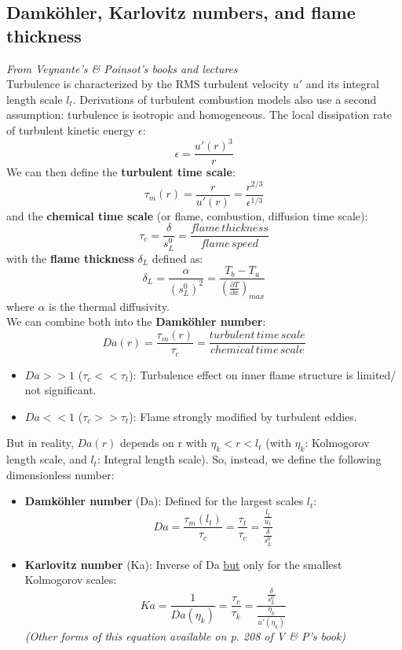 \documentclass[a4paper,11pt]{article}
\begin{document}
\subsection{Damköhler, Karlovitz numbers, and flame thickness}
\textit{From Veynante's \& Poinsot's books and lectures}\vspace{5pt}\\
	Turbulence is characterized by the RMS turbulent velocity $u'$ and its integral length scale $l_t$. Derivations of turbulent combustion models also use a second assumption: turbulence is isotropic and homogeneous. The local dissipation rate of turbulent kinetic energy $\epsilon$:
	\[\epsilon = \frac{u'(r)^3}{r}\]
	We can then define the \textbf{turbulent time scale}: 
	\[\tau_m(r) = \frac{r}{u'(r)} = \frac{r^{2/3}}{\epsilon^{1/3}}\] 
	and the \textbf{chemical time scale} (or flame, combustion, diffusion time scale):
	\[\tau_c = \frac{\delta}{s^0_L} = \frac{flame\,thickness}{flame\,speed} \]
	with the \textbf{flame thickness} $\delta_L$ defined as: 
	\[ \delta_L = \frac{\alpha}{(s^0_L)^2} = \frac{T_b-T_u}{(\frac{\partial T}{\partial x})_{max}}\]
	where $\alpha$ is the thermal diffusivity.\\
	We can combine both into the \textbf{Damköhler number}:
	\[Da(r) = \frac{\tau_m(r)}{\tau_c}= \frac{turbulent\,time\,scale}{chemical\,time\,scale}\]
	\begin{itemize}
		\item $Da>>1$ ($\tau_c<<\tau_t$): Turbulence effect on inner flame structure is limited/ not significant.
		\item $Da<<1$ ($\tau_c>>\tau_t$): Flame strongly modified by turbulent eddies.
	\end{itemize}
But in reality, $Da(r)$ depends on r with $\eta_k < r < l_t$ (with $\eta_k$: Kolmogorov length scale, and $l_t$: Integral length scale). So, instead, we define the following dimensionless number:
\begin{itemize}
	\item \textbf{Damköhler number} (Da): Defined for the largest scales $l_t$:
	\[Da = \frac{\tau_m(l_t)}{\tau_c}=\frac{\tau_t}{\tau_c} = \frac{\frac{l_t}{u_t}}{\frac{\delta}{s^0_L}}\]
	\item \textbf{Karlovitz number} (Ka): Inverse of Da \underline{but} only for the smallest Kolmogorov scales:
	\[Ka = \frac{1}{Da(\eta_k)} = \frac{\tau_c}{\tau_k} = \frac{\frac{\delta}{s^0_L}}{\frac{\eta_k}{u'(\eta_k)}}  \]
	\textit{(Other forms of this equation available on p. 208 of V \& P's book)}
\end{itemize}
\end{document}
